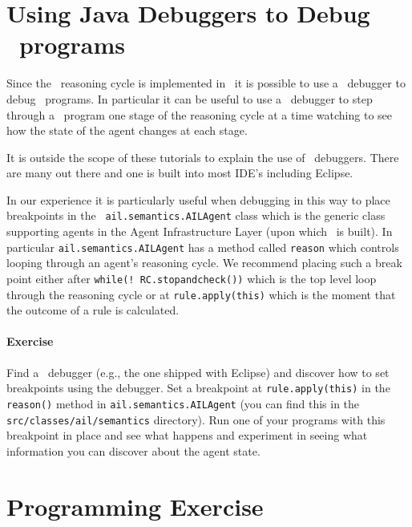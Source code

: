 \documentclass[a4]{article}
\begin{document}
\section{Using Java Debuggers to Debug \gwendolen\ programs}

Since the \gwendolen\ reasoning cycle is implemented in \java\ it is possible to use a \java\ debugger to debug \gwendolen\ programs.  In particular it can be useful to use a \java\ debugger to step through a \gwendolen\ program one stage of the reasoning cycle at a time watching to see how the state of the agent changes at each stage.

It is outside the scope of these tutorials to explain the use of \java\ debuggers.  There are many out there and one is built into most IDE's including Eclipse.

In our experience it is particularly useful when debugging in this way to place breakpoints in the \java\ \texttt{ail.semantics.AILAgent} class which is the generic class supporting agents in the Agent Infrastructure Layer (upon which \gwendolen\ is built).  In particular \texttt{ail.semantics.AILAgent} has a method called \texttt{reason} which controls looping through an agent's reasoning cycle.  We recommend placing such a break point either after \texttt{while(! RC.stopandcheck())} which is the top level loop through the reasoning cycle or at \texttt{rule.apply(this)} which is the moment that the outcome of a rule is calculated.

\paragraph{Exercise} Find a \java\ debugger (e.g., the one shipped with Eclipse) and discover how to set breakpoints using the debugger.  Set a breakpoint at \texttt{rule.apply(this)} in the \texttt{reason()} method in \texttt{ail.semantics.AILAgent} (you can find this in the \texttt{src/classes/ail/semantics} directory).  Run one of your programs with this breakpoint in place and see what happens and experiment in seeing what information you can discover about the agent state.

\section{Programming Exercise}
\end{document}
